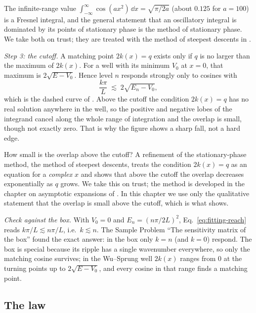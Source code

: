 \begin{beyond}
The infinite-range value $\int_{-\infty}^{\infty}\cos(ax^2)\,\dd x=\sqrt{\pi/2a}$ (about $0.125$ for $a=100$) is a Fresnel integral, and the general statement that an oscillatory integral is dominated by its points of stationary phase is the method of stationary phase. We take both on trust; they are treated with the method of steepest descents in \cite{rhb}.
\end{beyond}

\emph{Step 3: the cutoff.} A matching point $2k(x)=q$ exists only if $q$ is no larger than the maximum of $2k(x)$. For a well with its minimum $V_0$ at $x=0$, that maximum is $2\sqrt{E-V_0}$. Hence level $n$ responds strongly only to cosines with
\begin{equation}
\frac{k\pi}{L}\;\lesssim\;2\sqrt{E_n-V_0},
\label{eq:fitting-reach}
\end{equation}
which is the dashed curve of . Above the cutoff the condition $2k(x)=q$ has no real solution anywhere in the well, so the positive and negative lobes of the integrand cancel along the whole range of integration and the overlap is small, though not exactly zero. That is why the figure shows a sharp fall, not a hard edge.

\begin{beyond}
How small is the overlap above the cutoff? A refinement of the stationary-phase method, the method of steepest descents, treats the condition $2k(x)=q$ as an equation for a \emph{complex} $x$ and shows that above the cutoff the overlap decreases exponentially as $q$ grows. We take this on trust; the method is developed in the chapter on asymptotic expansions of \cite{rhb}. In this chapter we use only the qualitative statement that the overlap is small above the cutoff, which is what  shows.
\end{beyond}

\emph{Check against the box.} With $V_0=0$ and $E_n=(n\pi/2L)^2$, Eq.~\eqref{eq:fitting-reach} reads $k\pi/L\lesssim n\pi/L$, i.e.\ $k\lesssim n$. The Sample Problem ``The sensitivity matrix of the box'' found the exact answer: in the box only $k=n$ (and $k=0$) respond. The box is special because its ripple has a single wavenumber everywhere, so only the matching cosine survives; in the Wu--Sprung well $2k(x)$ ranges from 0 at the turning points up to $2\sqrt{E-V_0}$, and every cosine in that range finds a matching point.

\subsection{The law}

